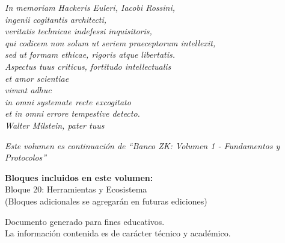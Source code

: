 \documentclass[11pt,a4paper,twoside]{book}
\theoremstyle{definition}
\theoremstyle{remark}
\renewcommand{\cleardoublepage}{\clearpage}
\begin{document}
\thispagestyle{empty}
\null\vfill
\begin{flushright}
\textit{\large In memoriam Hackeris Euleri, Iacobi Rossini,\\[0.3cm]
ingenii cogitantis architecti,\\
veritatis technicae indefessi inquisitoris,\\
qui codicem non solum ut seriem praeceptorum intellexit,\\
sed ut formam ethicae, rigoris atque libertatis.\\[0.5cm]
Aspectus tuus criticus, fortitudo intellectualis\\
et amor scientiae\\
vivunt adhuc\\
in omni systemate recte excogitato\\
et in omni errore tempestive detecto.\\[1cm]
Walter Milstein, pater tuus}
\end{flushright}
\vfill
\cleardoublepage

\thispagestyle{empty}
\vspace*{\fill}
\begin{center}
\textit{Este volumen es continuación de ``Banco ZK: Volumen 1 - Fundamentos y Protocolos''}

\vspace{1cm}

\textbf{Bloques incluidos en este volumen:}\\[0.5cm]
Bloque 20: Herramientas y Ecosistema\\
(Bloques adicionales se agregarán en futuras ediciones)

\vspace{2cm}

\small
Documento generado para fines educativos.\\
La información contenida es de carácter técnico y académico.
\end{center}
\vspace*{\fill}
\clearpage

\tableofcontents
\clearpage

\end{document}
